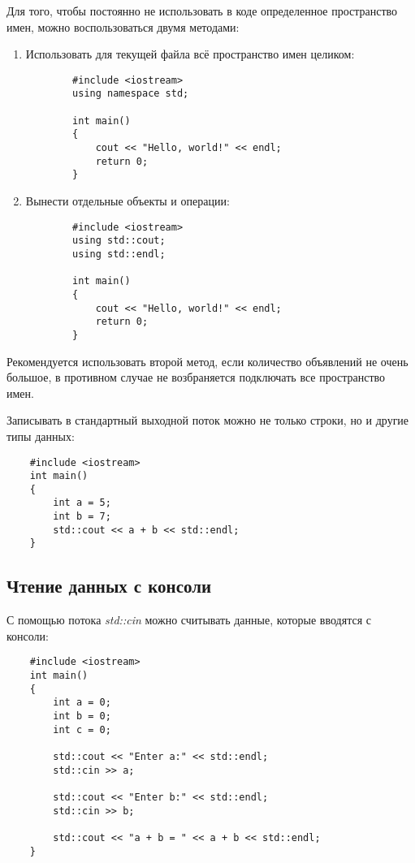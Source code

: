 Для того, чтобы постоянно не использовать в коде определенное пространство имен, можно воспользоваться двумя методами:
\begin{enumerate}
    \item Использовать для текущей файла всё пространство имен целиком:
    \begin{lstlisting}
        #include <iostream>
        using namespace std;

        int main()
        {
            cout << "Hello, world!" << endl;
            return 0;
        }
    \end{lstlisting}

    \item Вынести отдельные объекты и операции:
    \begin{lstlisting}
        #include <iostream>
        using std::cout;
        using std::endl;

        int main()
        {
            cout << "Hello, world!" << endl;
            return 0;
        }
    \end{lstlisting}
\end{enumerate}

Рекомендуется использовать второй метод, если количество объявлений не очень большое, в противном случае не возбраняется подключать все пространство имен.

Записывать в стандартный выходной поток можно не только строки, но и другие типы данных:

\begin{lstlisting}
    #include <iostream>
    int main()
    {
        int a = 5;
        int b = 7;
        std::cout << a + b << std::endl;
    }
\end{lstlisting}

\subsection{Чтение данных с консоли}

С помощью потока \textit{std::cin} можно считывать данные, которые вводятся с консоли:
\begin{lstlisting}
    #include <iostream>
    int main()
    {
        int a = 0;
        int b = 0;
        int c = 0;

        std::cout << "Enter a:" << std::endl;
        std::cin >> a;

        std::cout << "Enter b:" << std::endl;
        std::cin >> b;

        std::cout << "a + b = " << a + b << std::endl;
    }
\end{lstlisting}

